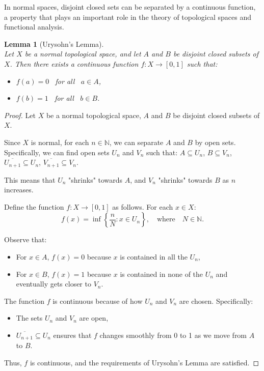 \documentclass[12pt, reqno]{amsart}
\newtheorem{lemma}[theorem]{Lemma}
\theoremstyle{definition}
\numberwithin{equation}{section}
\newcommand{\dN}{{\mathbb N}}
\begin{document}
In normal spaces, disjoint closed sets can be separated by a continuous function, a property that plays an important role in the theory of topological spaces and functional analysis.

\begin{lemma} [Urysohn's Lemma] \hfill \\
    Let $X$ be a normal topological space, and let $A$ and $B$ be disjoint closed subsets of $X$. Then there exists a continuous function $f: X \to [0,1]$ such that:
\begin{itemize}
    \item $f(a) = 0$ \, for all \, $a \in A$,
    \item $f(b) = 1$ \, for all \, $b \in B$.
\end{itemize}
\end{lemma}

\begin{proof}
Let $X$ be a normal topological space, $A$ and $B$ be disjoint closed subsets of $X$. 

Since $X$ is normal, for each $n \in \dN$, we can separate $A$ and $B$ by open sets. Specifically, we can find open sets $U_n$ and $V_n$ such that:
$A \subseteq U_n$,
$B \subseteq V_n$,
$\overline{U_{n+1}} \subseteq U_n$,
$\overline{V_{n+1}} \subseteq V_n$.

This means that $U_n$ "shrinks" towards $A$, and $V_n$ "shrinks" towards $B$ as $n$ increases.

Define the function $f: X \to [0, 1]$ as follows. For each $x \in X$:
\[
f(x) = \inf \left\{ \frac{n}{N} : x \in U_n \right\}, \quad \text{where} \quad N \in \dN.
\]

Observe that:
\begin{itemize}
    \item For $x \in A$, $f(x) = 0$ because $x$ is contained in all the $U_n$,
    \item For $x \in B$, $f(x) = 1$ because $x$ is contained in none of the $U_n$ and eventually gets closer to $V_n$.
\end{itemize}

The function $f$ is continuous because of how $U_n$ and $V_n$ are chosen. Specifically:
\begin{itemize}
    \item The sets $U_n$ and $V_n$ are open,
    \item $\overline{U_{n+1}} \subseteq U_n$ ensures that $f$ changes smoothly from 0 to 1 as we move from $A$ to $B$.
\end{itemize}

Thus, $f$ is continuous, and the requirements of Urysohn's Lemma are satisfied.
\end{proof}
\end{document}
